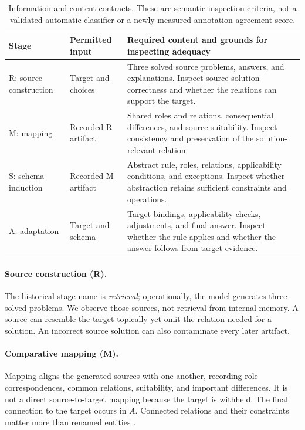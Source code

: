\begin{table}[t]
\centering\small
\begin{tabularx}{\textwidth}{@{}p{1.8cm}p{3.05cm}X@{}}
\toprule
Stage & Permitted input & Required content and grounds for inspecting adequacy \\
\midrule
R: source construction & Target and choices & Three solved source problems, answers, and explanations. Inspect source-solution correctness and whether the relations can support the target. \\
M: mapping & Recorded R artifact & Shared roles and relations, consequential differences, and source suitability. Inspect consistency and preservation of the solution-relevant relation. \\
S: schema induction & Recorded M artifact & Abstract rule, roles, relations, applicability conditions, and exceptions. Inspect whether abstraction retains sufficient constraints and operations. \\
A: adaptation & Target and schema & Target bindings, applicability checks, adjustments, and final answer. Inspect whether the rule applies and whether the answer follows from target evidence. \\
\bottomrule
\end{tabularx}
\caption{Information and content contracts. These are semantic inspection criteria, not a validated automatic classifier or a newly measured annotation-agreement score.}
\label{tab:contracts}
\end{table}

\paragraph{Source construction (R).}
The historical stage name is \emph{retrieval}; operationally, the model generates three solved problems. We observe those sources, not retrieval from internal memory. A source can resemble the target topically yet omit the relation needed for a solution. An incorrect source solution can also contaminate every later artifact.

\paragraph{Comparative mapping (M).}
Mapping aligns the generated sources with one another, recording role correspondences, common relations, suitability, and important differences. It is not a direct source-to-target mapping because the target is withheld. The final connection to the target occurs in $A$. Connected relations and their constraints matter more than renamed entities \citep{gentner1997mapping}.

